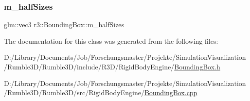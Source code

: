 \subsubsection{\texorpdfstring{m\+\_\+half\+Sizes}{m\_halfSizes}}
{\footnotesize\ttfamily glm\+::vec3 r3\+::\+Bounding\+Box\+::m\+\_\+half\+Sizes\hspace{0.3cm}{\ttfamily [protected]}}



The documentation for this class was generated from the following files\+:\begin{DoxyCompactItemize}
\item 
D\+:/\+Library/\+Documents/\+Job/\+Forschungsmaster/\+Projekte/\+Simulation\+Visualization/\+Rumble3\+D/\+Rumble3\+D/include/\+R3\+D/\+Rigid\+Body\+Engine/\mbox{\hyperlink{_bounding_box_8h}{Bounding\+Box.\+h}}\item 
D\+:/\+Library/\+Documents/\+Job/\+Forschungsmaster/\+Projekte/\+Simulation\+Visualization/\+Rumble3\+D/\+Rumble3\+D/src/\+Rigid\+Body\+Engine/\mbox{\hyperlink{_bounding_box_8cpp}{Bounding\+Box.\+cpp}}\end{DoxyCompactItemize}
